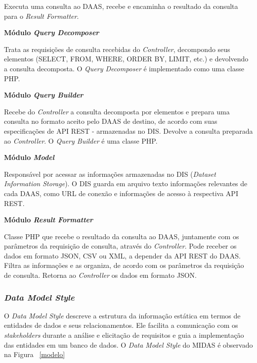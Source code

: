 \documentclass[11pt,a4paper]{article}
\begin{document}
Executa uma consulta ao DAAS, recebe e encaminha o resultado da consulta para o \textit{Result Formatter}.

\textbf{Módulo \textit{Query Decomposer}}

Trata as requisições de consulta recebidas do \textit{Controller}, decompondo seus elementos (SELECT, FROM, WHERE, ORDER BY, LIMIT, etc.) e devolvendo a consulta decomposta. O \textit{Query Decomposer} é implementado como uma classe PHP.

\textbf{Módulo \textit{Query Builder}}

Recebe do \textit{Controller} a consulta decomposta por elementos e prepara uma consulta no formato aceito pelo DAAS de destino, de acordo com suas 
especificações de API REST - armazenadas no DIS. Devolve a consulta preparada ao \textit{Controller}. O \textit{Query Builder} é uma classe PHP.

\textbf{Módulo \textit{Model}}

Responsável por acessar as informações armazenadas no DIS (\textit{Dataset Information Storage}). O DIS guarda em arquivo texto informações relevantes de cada DAAS, como URL de conexão e informações de acesso à respectiva API REST. 

\textbf{Módulo \textit{Result Formatter}}

Classe PHP que recebe o resultado da consulta ao DAAS, juntamente com os parâmetros da requisição de consulta, através do \textit{Controller}. Pode receber os dados em formato JSON, CSV ou XML, a depender da API REST do DAAS. 
Filtra as informações e as organiza, de acordo com os parâmetros da requisição de consulta. Retorna ao \textit{Controller} os dados em formato JSON. 



\subsubsection{\textit{Data Model Style}}

O \textit{Data Model Style} descreve a estrutura da informação estática em termos de entidades de dados e seus relacionamentos. Ele facilita a comunicação com os \textit{stakeholders} durante a análise e elicitação de requisitos e guia a implementação das entidades em um banco de dados. O \textit{Data Model Style} do MIDAS é observado na Figura ~\ref{modelo}
\end{document}
